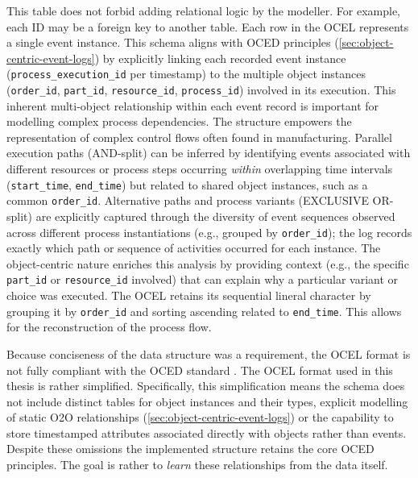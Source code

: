 This table does not forbid adding relational logic by the modeller. For example, each ID may be a foreign key to another table. Each row in the OCEL represents a single event instance. This schema aligns with OCED principles (\autoref{sec:object-centric-event-logs}) by explicitly linking each recorded event instance (\texttt{process\_execution\_id} per timestamp) to the multiple object instances (\texttt{order\_id}, \texttt{part\_id}, \texttt{resource\_id}, \texttt{process\_id}) involved in its execution. This inherent multi-object relationship within each event record is important for modelling complex process dependencies. The structure empowers the representation of complex control flows often found in manufacturing. Parallel execution paths (AND-split) can be inferred by identifying events associated with different resources or process steps occurring \textit{within} overlapping time intervals (\texttt{start\_time}, \texttt{end\_time}) but related to shared object instances, such as a common \texttt{order\_id}. Alternative paths and process variants (EXCLUSIVE OR-split) are explicitly captured through the diversity of event sequences observed across different process instantiations (e.g., grouped by \texttt{order\_id}); the log records exactly which path or sequence of activities occurred for each instance. The object-centric nature enriches this analysis by providing context (e.g., the specific \texttt{part\_id} or \texttt{resource\_id} involved) that can explain why a particular variant or choice was executed. The OCEL retains its sequential lineral character by grouping it by \texttt{order\_id} and sorting ascending related to \texttt{end\_time}. This allows for the reconstruction of the process flow.

Because conciseness of the data structure was a requirement, the OCEL format is not fully compliant with the OCED standard \autocite{van2023object}. The OCEL format used in this thesis is rather simplified. Specifically, this simplification means the schema does not include distinct tables for object instances and their types, explicit modelling of static O2O relationships (\autoref{sec:object-centric-event-logs}) or the capability to store timestamped attributes associated directly with objects rather than events. Despite these omissions the implemented structure retains the core OCED principles. The goal is rather to \textit{learn} these relationships from the data itself.

